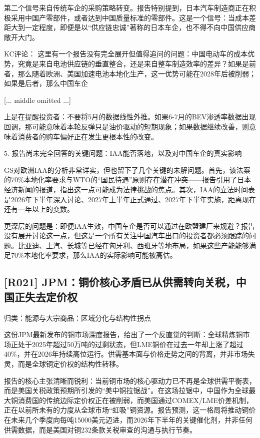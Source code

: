 \documentclass[11pt]{ctexart}
\begin{document}
第二个信号来自传统车企的采购策略转变。报告特别提到，日本汽车制造商正在积极采用中国产零部件，或者达到中国质量标准的零部件。这是一个信号：当成本差距大到一定程度，即便是以“供应链忠诚”著称的日本车企，也不得不向中国供应商敞开大门。

KC评论： 这里有一个报告没有完全展开但值得追问的问题：中国电动车的成本优势，究竟是来自电池供应链的垂直整合，还是来自整车制造效率的差异？如果是前者，那么随着欧洲、美国加速电池本地化生产，这一优势可能在2028年后被削弱；如果是后者，那么中国车企

[... middle omitted ...]

上是在提醒投资者：不要将5月的数据线性外推。如果6-7月的BEV渗透率数据出现回调，那可能意味着本轮反弹只是油价驱动的短期现象；如果数据继续改善，则意味着消费者的购车偏好正在发生更根本性的改变。

5. 报告尚未完全回答的关键问题：IAA能否落地，以及对中国车企的真实影响

GS对欧洲IAA的分析非常详实，但也留下了几个关键的未解问题。首先，该法案的70\%本地化率要求与WTO的“国民待遇”原则存在潜在冲突——报告引用了日本经济新闻的报道，指出这一点可能成为法律挑战的焦点。其次，IAA的立法时间表是2026年下半年深入讨论、2027年上半年正式通过、2027年下半年实施，距离现在还有一年以上的变数。

更深层的问题是：即便IAA生效，中国车企是否可以通过在欧盟建厂来规避？报告没有展开讨论这一点，但这是一个所有关注中国汽车出口的投资者都必须跟踪的问题。比亚迪、上汽、长城等已经在匈牙利、西班牙等地布局，如果这些产能能够满足70\%本地化率要求，那么IAA的实际影响可能被高估。

\subsection{[R021] JPM：铜价核心矛盾已从供需转向关税，中国正失去定价权}
{\small\color{refgray}归类：能源与大宗商品：区域分化与结构性拐点}

这份JPM最新发布的铜市场深度报告，给出了一个反直觉的判断：全球精炼铜市场正处于2025年超过50万吨的过剩状态，但LME铜价在过去一年却上涨了超过40\%，并在2026年持续高位运行。供需基本面与价格走势之间的背离，并非市场失灵，而是全球铜定价权的结构性转移。

报告的核心主张清晰而锐利：当前铜市场的核心驱动力已不再是全球供需平衡表，而是美国关税政策预期所引发的“美中铜拉锯战”。在这场拉锯中，中国作为全球最大铜消费国的传统边际定价权正在被削弱，而美国通过COMEX/LME价差机制，正在以前所未有的力度从全球市场“虹吸”铜资源。报告预测，这一格局将推动铜价在未来几个季度向每吨15000美元迈进，而2026年下半年的关键催化剂，并非任何供需数据，而是美国对铜232条款关税审查的沟通与执行节奏。
\end{document}
